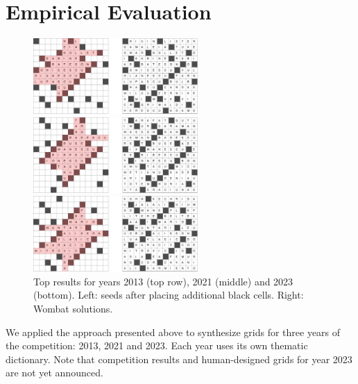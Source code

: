 \section{Empirical Evaluation}


\begin{figure}[th]
\centering
\includegraphics[width=0.56\textwidth]{_empiricalSupport/y-2013/results/_runWombat/mrmeGrids_y2013-60x932-14400x352-14113466-paper.pdf}

\vspace{0.15cm}

\includegraphics[width=0.56\textwidth]{_empiricalSupport/y-2021/results/_runWombat/mrmeGrids_feb3-60x38035-14400x224-13741779-paper.pdf}

\vspace{0.15cm}

\includegraphics[width=0.56\textwidth]{_empiricalSupport/y-2023/results/_runWombat/mrmeGrids_y2023-60x446-14400x352-14179462-paper.pdf}

\caption{Top results for years 2013 (top row), 2021 (middle) and 2023 (bottom). Left: seeds after
placing additional black cells. Right: {\sc Wombat} solutions.}
\label{fig:results}
\end{figure}

We applied the approach presented above to synthesize grids for three years of the competition: 2013, 2021 and 2023. Each year uses its own thematic dictionary. Note that competition results and human-designed grids for year 2023 are not yet announced.

